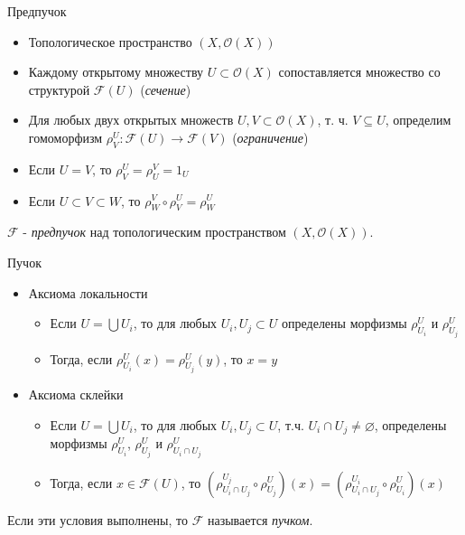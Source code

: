 \documentclass{beamer}
\begin{document}
\begin{frame}{Предпучок}
\begin{itemize}
	\item Топологическое пространство $(X, \mathcal{O}(X))$
	\item Каждому открытому множеству $U \subset \mathcal{O}(X)$ сопоставляется множество со структурой $\mathcal{F}(U)$ (\textit{сечение})
	\item Для любых двух открытых множеств $U, V \subset \mathcal{O}(X)$, т. ч. $V \subseteq U$, определим гомоморфизм $\rho^U_V : \mathcal{F}(U) \to \mathcal{F}(V)$ (\textit{ограничение})
	\item Если $U = V$, то $\rho^U_V = \rho^V_U = 1_U$
	\item Если $U \subset V \subset W$, то $\rho^V_W \circ \rho^U_V = \rho^U_W$
\end{itemize}
\bigskip
$\mathcal{F}$ - \textit{предпучок} над топологическим пространством $(X, \mathcal{O}(X))$.
\end{frame}

\begin{frame}{Пучок}
\begin{itemize}
	\item Аксиома локальности
		\medskip
		\begin{itemize}
			\item Если $U = \bigcup U_i$, то для любых $U_i, U_j \subset U$ определены морфизмы $\rho^U_{U_i}$ и $\rho^U_{U_j}$
			\medskip
			\item Тогда, если $\rho^U_{U_i}(x) = \rho^U_{U_j}(y)$, то $x = y$
		\end{itemize}
	\bigskip
	\item Аксиома склейки
		\medskip
		\begin{itemize}
			\item Если $U = \bigcup U_i$, то для любых $U_i, U_j \subset U$, т.ч. $U_i \cap U_j \neq \varnothing$, определены морфизмы $\rho^U_{U_i}$, $\rho^U_{U_j}$ и $\rho^U_{U_i \cap U_j}$
			\medskip
			\item Тогда, если $x \in \mathcal{F}(U)$, то $(\rho^{U_j}_{U_i \cap U_j} \circ \rho^U_{U_j})(x) = (\rho^{U_i}_{U_i \cap U_j} \circ \rho^U_{U_i})(x)$
		\end{itemize}
\end{itemize}
\bigskip
Если эти условия выполнены, то $\mathcal{F}$ называется \textit{пучком}.
\end{frame}
\end{document}

